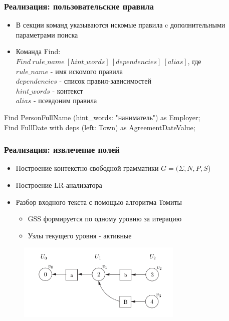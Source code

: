 \documentclass{beamer}
\begin{document}
\begin{frame}[fragile]
\frametitle{Реализация: пользовательские правила}
\begin{itemize}
	\item В секции команд указываются искомые правила c дополнительными параметрами поиска
	\item Команда Find:\\ 
	$Find\ rule\_name\ [hint\_words]\ [dependencies]\ [alias]$, где\\
	$rule\_name$ - имя искомого правила\\
	$dependencies$ - список правил-зависимостей\\
	$hint\_words$ - контекст\\
	$alias$ - псевдоним правила
\end{itemize}
\begin{example}
Find PersonFullName (hint\_words: "наниматель") as Employer;\\
Find FullDate with deps (left: Town) as AgreementDateValue;
\end{example}
\end{frame}

\begin{frame}
\frametitle{Реализация: извлечение полей}
\begin{itemize}
	\item Построение контекстно-свободной грамматики $G = (\Sigma, N, P, S$)
	\item Построение LR-анализатора
	\item Разбор входного текста с помощью алгоритма Томиты
	\begin{itemize}
		\item GSS формируется по одному уровню за итерацию
		\item Узлы текущего уровня - активные
	\end{itemize}
\end{itemize}
\begin{figure}%
\centering
\includegraphics[width=0.7\textwidth]{img/gss-step3.png}
\end{figure}
\end{frame}
\end{document}

